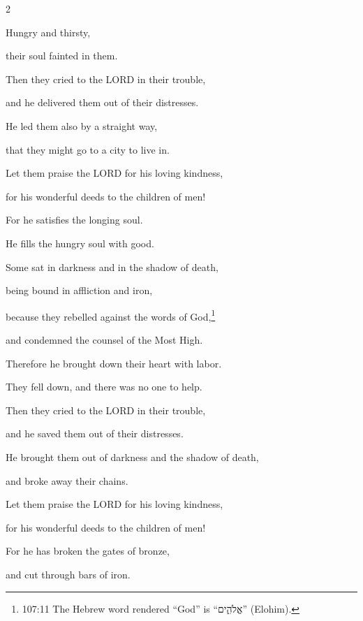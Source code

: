 \begin{multicols}{2}
	
	\myverse{}Hungry and thirsty,
	
	their soul fainted in them.
	
	
	\myverse{}Then they cried to the LORD in their trouble,
	
	and he delivered them out of their distresses.
	
	
	\myverse{}He led them also by a straight way,
	
	that they might go to a city to live in.
	
	
	\myverse{}Let them praise the LORD for his loving kindness,
	
	for his wonderful deeds to the children of men!
	
	\vspace{\baselineskip}
	
	\myverse{}For he satisfies the longing soul.
	
	He fills the hungry soul with good.
	
	\vspace{\baselineskip}
	
	\myverse{}Some sat in darkness and in the shadow of death,
	
	being bound in affliction and iron,
	
	
	\myverse{}because they rebelled against the words of God,\footnote{107:11 The Hebrew word rendered “God” is “אֱלֹהִ֑ים” (Elohim).}
	
	and condemned the counsel of the Most High.
	
	
	\myverse{}Therefore he brought down their heart with labor.
	
	They fell down, and there was no one to help.
	
	
	\myverse{}Then they cried to the LORD in their trouble,
	
	and he saved them out of their distresses.
	
	
	\myverse{}He brought them out of darkness and the shadow of death,
	
	and broke away their chains.
	
	
	\myverse{}Let them praise the LORD for his loving kindness,
	
	for his wonderful deeds to the children of men!
	
	\vspace{\baselineskip}
	
	\myverse{}For he has broken the gates of bronze,
	
	and cut through bars of iron.
	
	\vspace{\baselineskip}
	

\end{multicols}
